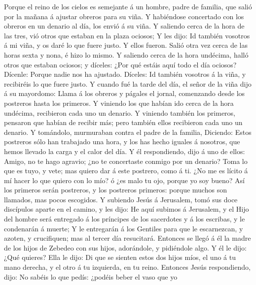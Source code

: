  Porque el reino de los cielos es semejante á un hombre,
padre de familia, que salió por la mañana á ajustar obreros para su
viña.  Y habiéndose concertado con los obreros en un
denario al día, los envió á su viña.  Y saliendo cerca de
la hora de las tres, vió otros que estaban en la plaza ociosos;
 Y les dijo: Id también vosotros á mi viña, y os daré lo
que fuere justo. Y ellos fueron.  Salió otra vez cerca de
las horas sexta y nona, é hizo lo mismo.  Y saliendo cerca
de la hora undécima, halló otros que estaban ociosos; y díceles: ¿Por
qué estáis aquí todo el día ociosos?  Dícenle: Porque
nadie nos ha ajustado. Díceles: Id también vosotros á la viña, y
recibiréis lo que fuere justo.  Y cuando fué la tarde del
día, el señor de la viña dijo á su mayordomo: Llama á los obreros y
págales el jornal, comenzando desde los postreros hasta los primeros.
 Y viniendo los que habían ido cerca de la hora undécima,
recibieron cada uno un denario.  Y viniendo también los
primeros, pensaron que habían de recibir más; pero también ellos
recibieron cada uno un denario.  Y tomándolo, murmuraban
contra el padre de la familia,  Diciendo: Estos postreros
sólo han trabajado una hora, y los has hecho iguales á nosotros, que
hemos llevado la carga y el calor del día.  Y él
respondiendo, dijo á uno de ellos: Amigo, no te hago agravio; ¿no te
concertaste conmigo por un denario?  Toma lo que es tuyo,
y vete; mas quiero dar á este postrero, como á ti.  ¿No
me es lícito á mí hacer lo que quiero con lo mío? ó ¿es malo tu ojo,
porque yo soy bueno?  Así los primeros serán postreros, y
los postreros primeros: porque muchos son llamados, mas pocos escogidos.
 Y subiendo Jesús á Jerusalem, tomó sus doce discípulos
aparte en el camino, y les dijo:  He aquí subimos á
Jerusalem, y el Hijo del hombre será entregado á los príncipes de los
sacerdotes y á los escribas, y le condenarán á muerte;  Y
le entregarán á los Gentiles para que le escarnezcan, y azoten, y
crucifiquen; mas al tercer día resucitará.  Entonces se
llegó á él la madre de los hijos de Zebedeo con sus hijos, adorándole, y
pidiéndole algo.  Y él le dijo: ¿Qué quieres? Ella le
dijo: Di que se sienten estos dos hijos míos, el uno á tu mano derecha,
y el otro á tu izquierda, en tu reino.  Entonces Jesús
respondiendo, dijo: No sabéis lo que pedís: ¿podéis beber el vaso que yo
